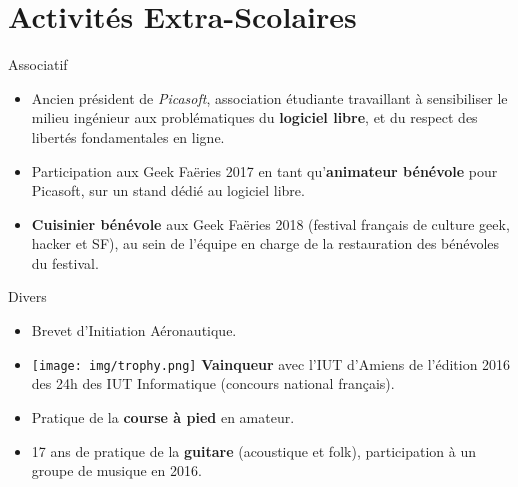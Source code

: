 \documentclass[a4paper]{twentysecondcv} %
\begin{document}

\section{Activités Extra-Scolaires}
\begin{twenty}
    \twentyitem
    	{}
		{}
        {Associatif}
        {}
        {}
        {\begin{itemize}
        \item Ancien président de \textit{Picasoft}, association étudiante travaillant à sensibiliser le milieu ingénieur aux problématiques du \textbf{logiciel libre}, et du respect des libertés fondamentales en ligne.
        \item Participation aux Geek Faëries 2017 en tant qu'\textbf{animateur bénévole} pour Picasoft, sur un stand dédié au logiciel libre.
        \item \textbf{Cuisinier bénévole} aux Geek Faëries 2018 (festival français de culture geek, hacker et SF), au sein de l'équipe en charge de la restauration des bénévoles du festival.
        \end{itemize}}
    \twentyitem
        {}
                {}
        {Divers}
        {}
        {}
        {\begin{itemize}
        \item Brevet d'Initiation Aéronautique.
        \item \texttt{[image: img/trophy.png]} \textbf{Vainqueur} avec l'IUT d'Amiens de l'édition 2016 des 24h des IUT Informatique (concours national français).
        \item Pratique de la \textbf{course à pied} en amateur. 
        \item 17 ans de pratique de la \textbf{guitare} (acoustique et folk), participation à un groupe de musique en 2016.
        \end{itemize}}
\end{twenty}
\end{document}
